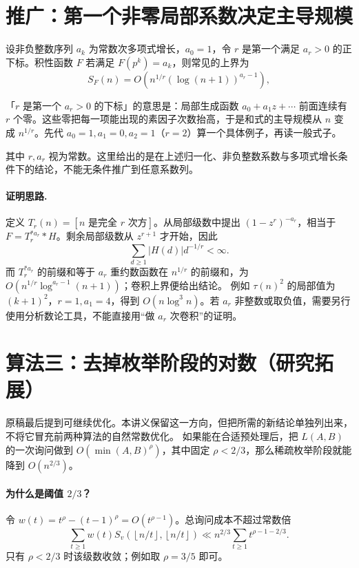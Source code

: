 \documentclass[UTF8,a4paper,11pt,oneside,openany,fontset=fandol]{ctexbook}
\theoremstyle{definition}
\newcommand{\floor}[1]{\left\lfloor #1\right\rfloor}
\begin{document}
\section{推广：第一个非零局部系数决定主导规模}
设非负整数序列 $a_k$ 为常数次多项式增长，$a_0=1$，令 $r$ 是第一个满足 $a_r>0$ 的正下标。积性函数 $F$ 若满足 $F(p^k)=a_k$，则常见的上界为
\[
 S_F(n)=O\left(n^{1/r}(\log(n+1))^{a_r-1}\right),
\]

\begin{tip}
「$r$ 是第一个 $a_r>0$ 的下标」的意思是：局部生成函数 $a_0+a_1z+\cdots$ 前面连续有 $r$ 个零。这些零把每一项能出现的素因子次数抬高，于是和式的主导规模从 $n$ 变成 $n^{1/r}$。先代 $a_0=1,a_1=0,a_2=1$（$r=2$）算一个具体例子，再读一般式子。
\end{tip}

其中 $r,a_r$ 视为常数。这里给出的是在上述归一化、非负整数系数与多项式增长条件下的结论，不能无条件推广到任意系数列。

\paragraph{证明思路.} 定义 $T_r(n)=[n\text{ 是完全 }r\text{ 次方}]$。从局部级数中提出 $(1-z^r)^{-a_r}$，相当于 $F=T_r^{*a_r}*H$。剩余局部级数从 $z^{r+1}$ 才开始，因此
\[
 \sum_{d\ge1}|H(d)|d^{-1/r}<\infty.
\]
而 $T_r^{*a_r}$ 的前缀和等于 $a_r$ 重约数函数在 $n^{1/r}$ 的前缀和，为 $O(n^{1/r}\log^{a_r-1}(n+1))$；卷积上界便给出结论。
例如 $\tau(n)^2$ 的局部值为 $(k+1)^2$，$r=1,a_1=4$，得到 $O(n\log^3 n)$。若 $a_r$ 非整数或取负值，需要另行使用分析数论工具，不能直接用“做 $a_r$ 次卷积”的证明。


\section{算法三：去掉枚举阶段的对数（研究拓展）}
原稿最后提到可继续优化。本讲义保留这一方向，但把所需的新结论单独列出来，不将它冒充前两种算法的自然常数优化。
如果能在合适预处理后，把 $L(A,B)$ 的一次询问做到 $O(\min(A,B)^\rho)$，其中固定 $\rho<2/3$，那么稀疏枚举阶段就能降到 $O(n^{2/3})$。

\paragraph{为什么是阈值 $2/3$？}
令 $w(t)=t^\rho-(t-1)^\rho=O(t^{\rho-1})$。总询问成本不超过常数倍
\[
\sum_{t\ge1}w(t)S_v(\floor{n/t},\floor{n/t})
\ll n^{2/3}\sum_{t\ge1}t^{\rho-1-2/3}.
\]
只有 $\rho<2/3$ 时该级数收敛；例如取 $\rho=3/5$ 即可。
\end{document}
